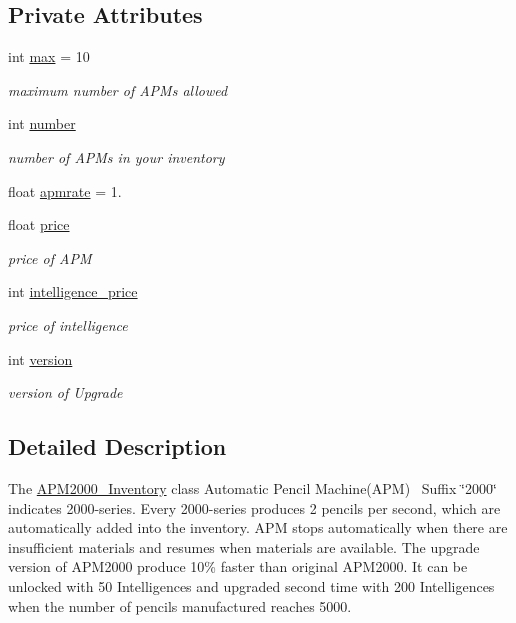 \subsection*{Private Attributes}
\begin{DoxyCompactItemize}
\item 
int \mbox{\hyperlink{classAPM2000__Inventory_af325ac7f920a0ab954621b6f44121bc2}{max}} = 10
\begin{DoxyCompactList}\small\item\em maximum number of A\+P\+Ms allowed \end{DoxyCompactList}\item 
int \mbox{\hyperlink{classAPM2000__Inventory_a0393939ee2dd57ec3855bb98070da2ad}{number}}
\begin{DoxyCompactList}\small\item\em number of A\+P\+Ms in your inventory \end{DoxyCompactList}\item 
float \mbox{\hyperlink{classAPM2000__Inventory_a51778099d3b5f24cffbef6a67861f686}{apmrate}} = 1.
\item 
float \mbox{\hyperlink{classAPM2000__Inventory_a56588e2f627cbe3fccf6235773d77889}{price}}
\begin{DoxyCompactList}\small\item\em price of A\+PM \end{DoxyCompactList}\item 
int \mbox{\hyperlink{classAPM2000__Inventory_ad28d9181ef8ef98da5af0c6faca0baba}{intelligence\+\_\+price}}
\begin{DoxyCompactList}\small\item\em price of intelligence \end{DoxyCompactList}\item 
int \mbox{\hyperlink{classAPM2000__Inventory_a49716258b589409d1e8c3c445d19289d}{version}}
\begin{DoxyCompactList}\small\item\em version of Upgrade \end{DoxyCompactList}\end{DoxyCompactItemize}


\subsection{Detailed Description}
The \mbox{\hyperlink{classAPM2000__Inventory}{A\+P\+M2000\+\_\+\+Inventory}} class Automatic Pencil Machine(\+A\+P\+M)~\newline
Suffix \char`\"{}2000\char`\"{} indicates 2000-\/series. Every 2000-\/series produces 2 pencils per second, which are automatically added into the inventory. A\+PM stops automatically when there are insufficient materials and resumes when materials are available. The upgrade version of A\+P\+M2000 produce 10\% faster than original A\+P\+M2000. It can be unlocked with 50 Intelligences and upgraded second time with 200 Intelligences when the number of pencils manufactured reaches 5000. 

